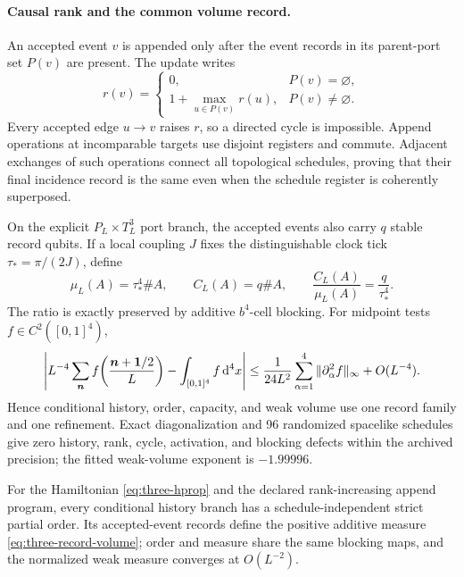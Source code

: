 \paragraph{Causal rank and the common volume record.}
An accepted event \(v\) is appended only after the event records in its
parent-port set \(P(v)\) are present.  The update writes
\begin{equation}
 r(v)=
 \begin{cases}
 0,&P(v)=\varnothing,\\
 1+\max_{u\in P(v)}r(u),&P(v)\neq\varnothing .
 \end{cases}
\label{eq:three-causal-rank}
\end{equation}
Every accepted edge \(u\to v\) raises \(r\), so a directed cycle is
impossible.  Append operations at incomparable targets use disjoint
registers and commute.  Adjacent exchanges of such operations connect all
topological schedules, proving that their final incidence record is the
same even when the schedule register is coherently superposed.

On the explicit \(P_L\times T_L^3\) port branch, the accepted events also
carry \(q\) stable record qubits.  If a local coupling \(J\) fixes the
distinguishable clock tick \(\tau_*=\pi/(2J)\), define
\begin{equation}
 \mu_L(A)=\tau_*^4\#A,\qquad
 C_L(A)=q\#A,\qquad
 \frac{C_L(A)}{\mu_L(A)}=\frac{q}{\tau_*^4}.
\label{eq:three-record-volume}
\end{equation}
The ratio is exactly preserved by additive \(b^4\)-cell blocking.  For
midpoint tests \(f\in C^2([0,1]^4)\),
\begin{equation}
 \left|L^{-4}\sum_{\bm n}f\!\left(
 \frac{\bm n+\bm1/2}{L}\right)-\int_{[0,1]^4}f\,\mathrm d^4x\right|
 \leq\frac1{24L^2}
 \sum_{\alpha=1}^4\|\partial_\alpha^2f\|_\infty+O(L^{-4}).
\label{eq:three-weak-volume}
\end{equation}
Hence conditional history, order, capacity, and weak volume use one record
family and one refinement.  Exact diagonalization and 96 randomized
spacelike schedules give zero history, rank, cycle, activation, and blocking
defects within the archived precision; the fitted weak-volume exponent is
\(-1.99996\).

\begin{theorem}
\label{thm:three-relational-order-volume}
For the Hamiltonian \eqref{eq:three-hprop} and the declared rank-increasing
append program, every conditional history branch has a schedule-independent
strict partial order.  Its accepted-event records define the positive
additive measure \eqref{eq:three-record-volume}; order and measure share the
same blocking maps, and the normalized weak measure converges at
\(O(L^{-2})\).
\end{theorem}

